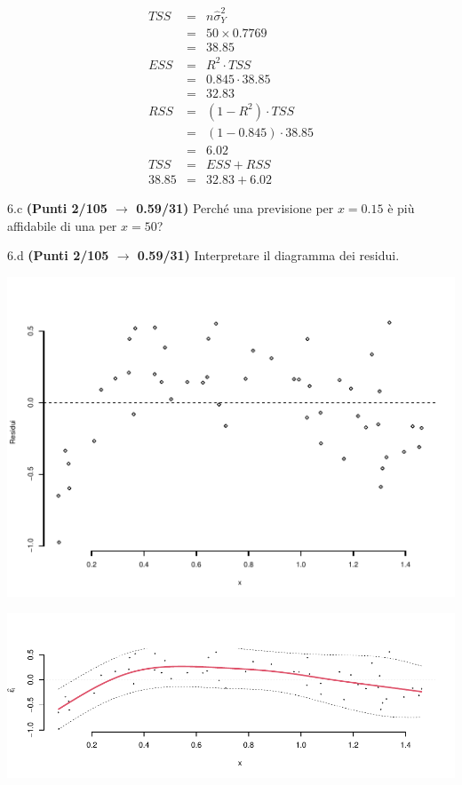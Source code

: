 \documentclass[
  11pt,
]{book}
\theoremstyle{mytheoremstyle}
\theoremstyle{mydefstyle}
\newenvironment{sol}
  {
  \begin{tcolorbox}[enhanced,breakable,arc=0.1mm,boxrule=1pt,colback=white,colframe=iblue,
  title=\bf \fontfamily{lmss}\selectfont \hspace{.5 cm} Soluzione,drop fuzzy shadow]

}{
\end{tcolorbox}
  }
\begin{document}
\begin{sol}
\begin{eqnarray*}
   TSS &=& n\hat\sigma^2_Y\\
      &=& 50 \times 0.7769 \\
      &=&  38.85 \\
   ESS &=& R^2\cdot TSS\\
      &=&  0.845 \cdot 38.85 \\
      &=& 32.83 \\
   RSS &=& (1-R^2)\cdot TSS\\
      &=& (1- 0.845 )\cdot 38.85 \\
      &=&  6.02 \\
   TSS &=& ESS+RSS \\ 38.85  &=&  32.83 + 6.02 
  \end{eqnarray*}

\end{sol}

6.c \textbf{(Punti 2/105 \(\rightarrow\) 0.59/31)} Perché una previsione per \(x=0.15\) è più affidabile di una per \(x=50\)?

6.d \textbf{(Punti 2/105 \(\rightarrow\) 0.59/31)} Interpretare il diagramma dei residui.

\begin{center}\includegraphics{Esami_passati_con_soluzioni_files/figure-latex/2023-64,-1} \end{center}

\begin{sol}

\begin{center}\includegraphics{Esami_passati_con_soluzioni_files/figure-latex/2023-65,-1} \end{center}

\end{sol}
\end{document}
